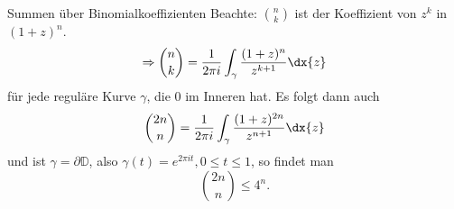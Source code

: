 \begin{karte}{Summen über Binomialkoeffizienten}
    Beachte: \(\binom{n}{k}\) ist der Koeffizient von \(z^k\) in \((1+z)^n\).
    \[ \Rightarrow \binom{n}{k} = \frac{1}{2\pi i} \int_\gamma \frac{(1+z)^{n}}{z^{k+1}} \dx{z} \]
    für jede reguläre Kurve \(\gamma\), die \(0\) im Inneren hat. Es folgt dann auch 
    \[ \binom{2n}{n} = \frac{1}{2\pi i} \int_\gamma \frac{(1+z)^{2n}}{z^{n+1}} \dx{z} \]
    und ist \(\gamma = \partial \mathbb{D}\), also \(\gamma(t) = e^{2\pi i t}, 0\leq t \leq 1\), 
    so findet man 
    \[ \binom{2n}{n} \leq 4^n. \]
\end{karte}